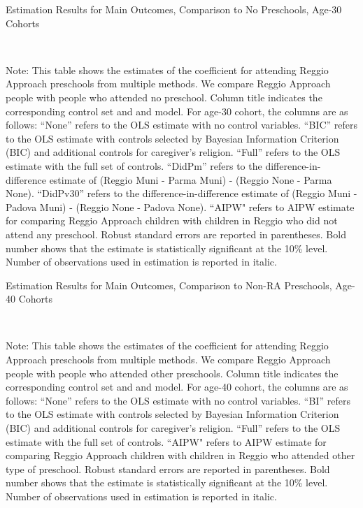 \begin{table}[H] \caption{Estimation Results for Main Outcomes, Comparison to No Preschools, Age-30 Cohorts} \label{ols-M-adult30-reg-nopres}
\scalebox{0.65}{}
\vspace{1ex} \\
\footnotesize\raggedright{Note: This table shows the estimates of the coefficient for attending Reggio Approach preschools from multiple methods. We compare Reggio Approach people with people who attended no preschool. Column title indicates the corresponding control set and and model. For age-30 cohort, the columns are as follows: ``None'' refers to the OLS estimate with no control variables. ``BIC'' refers to the OLS estimate with controls selected by Bayesian Information Criterion (BIC) and additional controls for caregiver's religion. ``Full'' refers to the OLS estimate with the full set of controls. ``DidPm'' refers to the difference-in-difference estimate of (Reggio Muni - Parma Muni) - (Reggio None - Parma None). ``DidPv30'' refers to the difference-in-difference estimate of (Reggio Muni - Padova Muni) - (Reggio None - Padova None).  ``AIPW" refers to AIPW estimate for comparing Reggio Approach children with children in Reggio who did not attend any preschool. Robust standard errors are reported in parentheses. Bold number shows that the estimate is statistically significant at the 10\% level. Number of observations used in estimation is reported in italic.}
\end{table}





\begin{table}[H] \caption{Estimation Results for Main Outcomes, Comparison to Non-RA Preschools, Age-40 Cohorts} \label{ols-M-adult40-reg-pres}
\scalebox{0.65}{}
\vspace{1ex} \\
\footnotesize\raggedright{Note: This table shows the estimates of the coefficient for attending Reggio Approach preschools from multiple methods. We compare Reggio Approach people with people who attended other preschools.  Column title indicates the corresponding control set and and model. For age-40 cohort, the columns are as follows: ``None'' refers to the OLS estimate with no control variables. ``BI'' refers to the OLS estimate with controls selected by Bayesian Information Criterion (BIC) and additional controls for caregiver's religion. ``Full'' refers to the OLS estimate with the full set of controls.  ``AIPW" refers to AIPW estimate for comparing Reggio Approach children with children in Reggio who attended other type of preschool.  Robust standard errors are reported in parentheses. Bold number shows that the estimate is statistically significant at the 10\% level. Number of observations used in estimation is reported in italic.}
\end{table}

